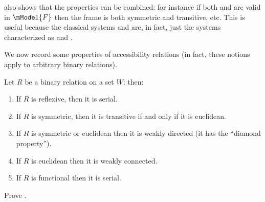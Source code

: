 \documentclass[../../../include/open-logic-section]{subfiles}
\begin{document}
 also shows that the properties can be
combined: for instance if both  and  are valid in
$\mModel{F}$ then the frame is both symmetric and transitive,
etc. This is useful because the classical systems  and
 are, in fact, just the systems characterized as  and
.
  
We now record some properties of accessibility relations (in fact,
these notions apply to arbitrary binary relations).

\begin{prop}
  Let $R$ be a binary relation on a set $W$; then:
  \begin{enumerate}
  \item If $R$ is reflexive, then it is serial.
  \item If $R$ is symmetric, then it is transitive if and only if it
    is euclidean.
  \item If $R$ is symmetric or euclidean then it is weakly directed
    (it has the ``diamond property'').
  \item If $R$ is euclidean then it is weakly connected.
  \item If $R$ is functional then it is serial.  
  \end{enumerate}
\end{prop}

\begin{prob}
  Prove .
\end{prob}
\end{document}
